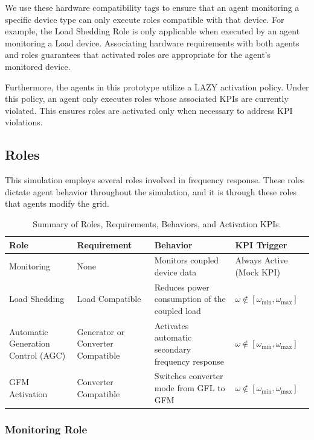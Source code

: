 \documentclass{article}
\begin{document}
We use these hardware compatibility tags to ensure that an agent monitoring a specific device type can only execute roles compatible with that device. For example, the Load Shedding Role is only applicable when executed by an agent monitoring a Load device. Associating hardware requirements with both agents and roles guarantees that activated roles are appropriate for the agent's monitored device.

Furthermore, the agents in this prototype utilize a LAZY activation policy. Under this policy, an agent only executes roles whose associated KPIs are currently violated. This ensures roles are activated only when necessary to address KPI violations.

\subsection{Roles}

This simulation employs several roles involved in frequency response. These roles dictate agent behavior throughout the simulation, and it is through these roles that agents modify the grid.

\begin{table}[h]
    \centering
    \small %
    \renewcommand{\arraystretch}{1.2} %
    \begin{tabular}{|p{3cm}|p{3cm}|p{4cm}|p{4cm}|} %
    \hline
    \textbf{Role} & \textbf{Requirement} & \textbf{Behavior} & \textbf{KPI Trigger} \\
    \hline
    Monitoring & None & Monitors coupled device data & Always Active (Mock KPI) \\
    Load Shedding & Load Compatible & Reduces power consumption of the coupled load & $\omega \notin [\omega_{\min},  \omega_{\max}]$\\
    Automatic Generation Control (AGC) & Generator or Converter Compatible& Activates automatic secondary frequency response & $\omega \notin [\omega_{\min},  \omega_{\max}]$\\
    GFM Activation & Converter Compatible & Switches converter mode from GFL to GFM & $\omega \notin [\omega_{\min},  \omega_{\max}]$\\
    \hline
    \end{tabular}
    \caption{Summary of Roles, Requirements, Behaviors, and Activation KPIs.}
    \label{tab:roles}
\end{table}

\subsubsection*{Monitoring Role}
\end{document}
